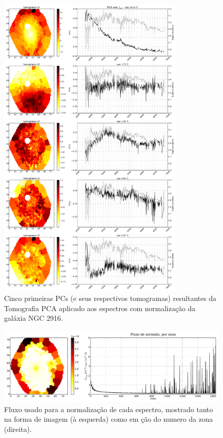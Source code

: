 \begin{figure}
    \includegraphics[width=0.8\textwidth]{figuras/K0277-tomo-obs-norm.pdf}
    \caption[Tomogramas de 1 a 5 da gal\'axia NGC 2916 - $f_{obs}$.]
    {Cinco primeiras PCs (e seus respectivos tomogramas) resultantes da Tomografia PCA aplicado aos espectros com
    normalização da galáxia NGC 2916.}
    \label{fig:K0277tomofobsnorm}
\end{figure}

\begin{figure}
    \includegraphics[width=1.\textwidth]{figuras/K0277-fobs_norm.pdf}
    \caption[Fluxos de normalização para cada zona da galáxia K0277.]
    {Fluxo usado para a normalização de cada espectro, mostrado tanto na forma de imagem (à esquerda) como em ção do numero da zona (direita).}
    \label{fig:K0277fobsnorm}
\end{figure}

